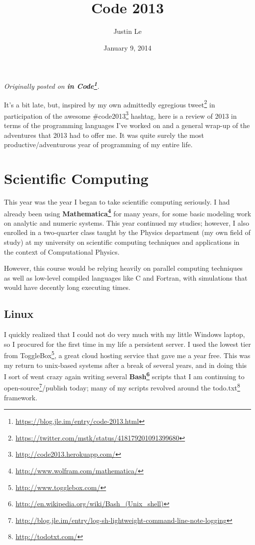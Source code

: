 \documentclass[]{article}
\title{Code 2013}
\author{Justin Le}
\date{January 9, 2014}
\renewcommand{\href}[2]{#2\footnote{\url{#1}}}
\begin{document}
\maketitle

\emph{Originally posted on
\textbf{\href{https://blog.jle.im/entry/code-2013.html}{in Code}}.}

It's a bit late, but, inspired by my own admittedly egregious
\href{https://twitter.com/mstk/status/418179201091399680}{tweet} in
participation of the awesome
\href{http://code2013.herokuapp.com/}{\#code2013} hashtag, here is a
review of 2013 in terms of the programming languages I've worked on and
a general wrap-up of the adventures that 2013 had to offer me. It was
quite surely the most productive/adventurous year of programming of my
entire life.

\section{Scientific Computing}\label{scientific-computing}

This year was the year I began to take scientific computing seriously. I
had already been using
\textbf{\href{http://www.wolfram.com/mathematica/}{Mathematica}} for
many years, for some basic modeling work on analytic and numeric
systems. This year continued my studies; however, I also enrolled in a
two-quarter class taught by the Physics department (my own field of
study) at my university on scientific computing techniques and
applications in the context of Computational Physics.

However, this course would be relying heavily on parallel computing
techniques as well as low-level compiled languages like C and Fortran,
with simulations that would have decently long executing times.

\subsection{Linux}\label{linux}

I quickly realized that I could not do very much with my little Windows
laptop, so I procured for the first time in my life a persistent server.
I used the lowest tier from \href{http://www.togglebox.com/}{ToggleBox},
a great cloud hosting service that gave me a year free. This was my
return to unix-based systems after a break of several years, and in
doing this I sort of went crazy again writing several
\textbf{\href{http://en.wikipedia.org/wiki/Bash_(Unix_shell)}{Bash}}
scripts that I am continuing to
\href{http://blog.jle.im/entry/log-sh-lightweight-command-line-note-logging}{open-source}/publish
today; many of my scripts revolved around the
\href{http://todotxt.com/}{todo.txt} framework.
\end{document}
